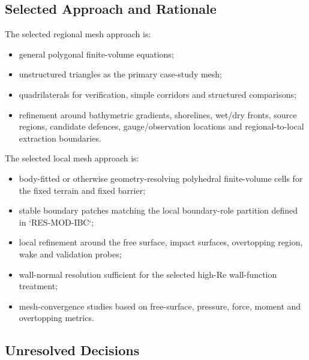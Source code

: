 
\subsection{Selected Approach and Rationale}
\label{sec:res-num-msh-selected-approach}


The selected regional mesh approach is:

\begin{itemize}
  \item general polygonal finite-volume equations;
  \item unstructured triangles as the primary case-study mesh;
  \item quadrilaterals for verification, simple corridors and structured
    comparisons;
  \item refinement around bathymetric gradients, shorelines, wet/dry
    fronts, source regions, candidate defences, gauge/observation
    locations and regional-to-local extraction boundaries.
\end{itemize}

The selected local mesh approach is:

\begin{itemize}
  \item body-fitted or otherwise geometry-resolving polyhedral
    finite-volume cells for the fixed terrain and fixed barrier;
  \item stable boundary patches matching the local boundary-role
    partition defined in `RES-MOD-IBC`;
  \item local refinement around the free surface, impact surfaces,
    overtopping region, wake and validation probes;
  \item wall-normal resolution sufficient for the selected high-Re
    wall-function treatment;
  \item mesh-convergence studies based on free-surface, pressure,
    force, moment and overtopping metrics.
\end{itemize}

\subsection{Unresolved Decisions}
\label{sec:res-num-msh-unresolved-decisions}

